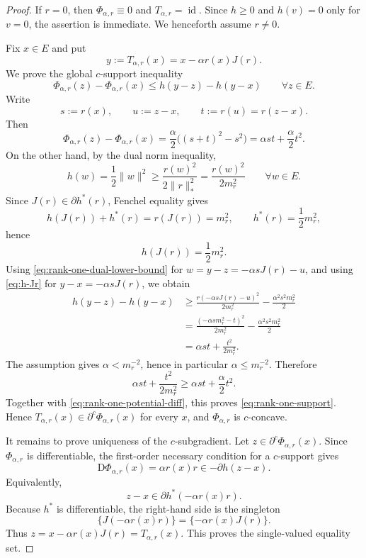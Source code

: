 \documentclass[a4paper,11pt]{article}
\numberwithin{equation}{section}
\newcommand{\id}{\operatorname{id}}
\newcommand{\D}{\mathrm D}
\begin{document}
	\begin{proof}
		If \(r=0\), then \(\Phi_{\alpha,r}\equiv0\) and \(T_{\alpha,r}=\id\). Since
		\(h\ge0\) and \(h(v)=0\) only for \(v=0\), the assertion is immediate. We henceforth
		assume \(r\ne0\).
		
		Fix \(x\in E\) and put
		\[
		y:=T_{\alpha,r}(x)=x-\alpha r(x)J(r).
		\]
		We prove the global \(c\)-support inequality
		\begin{equation}\label{eq:rank-one-support}
			\Phi_{\alpha,r}(z)-\Phi_{\alpha,r}(x)
			\le h(y-z)-h(y-x)
			\qquad\forall z\in E.
		\end{equation}
		Write
		\[
		s:=r(x),
		\qquad
		u:=z-x,
		\qquad
		t:=r(u)=r(z-x).
		\]
		Then
		\begin{equation}\label{eq:rank-one-potential-diff}
			\Phi_{\alpha,r}(z)-\Phi_{\alpha,r}(x)
			=\frac{\alpha}{2}\bigl((s+t)^2-s^2\bigr)
			=\alpha st+\frac{\alpha}{2}t^2.
		\end{equation}
		On the other hand, by the dual norm inequality,
		\begin{equation}\label{eq:rank-one-dual-lower-bound}
			h(w)=\frac12\|w\|^2
			\ge \frac{r(w)^2}{2\|r\|_*^2}
			=\frac{r(w)^2}{2m_r^2}
			\qquad\forall w\in E.
		\end{equation}
		Since \(J(r)\in\partial h^*(r)\), Fenchel equality gives
		\[
		h(J(r))+h^*(r)=r(J(r))=m_r^2,
		\qquad h^*(r)=\frac12m_r^2,
		\]
		hence
		\begin{equation}\label{eq:h-Jr}
			h(J(r))=\frac12m_r^2.
		\end{equation}
		Using \eqref{eq:rank-one-dual-lower-bound} for \(w=y-z=-\alpha sJ(r)-u\), and
		using \eqref{eq:h-Jr} for \(y-x=-\alpha sJ(r)\), we obtain
		\[
		\begin{aligned}
			h(y-z)-h(y-x)
			&\ge
			\frac{r(-\alpha sJ(r)-u)^2}{2m_r^2}
			-\frac{\alpha^2s^2m_r^2}{2} \\
			&=
			\frac{(-\alpha sm_r^2-t)^2}{2m_r^2}
			-\frac{\alpha^2s^2m_r^2}{2} \\
			&=
			\alpha st+\frac{t^2}{2m_r^2}.
		\end{aligned}
		\]
		The assumption gives \(\alpha<m_r^{-2}\), hence in particular \(\alpha\le m_r^{-2}\).
		Therefore
		\[
		\alpha st+\frac{t^2}{2m_r^2}
		\ge
		\alpha st+\frac{\alpha}{2}t^2.
		\]
		Together with \eqref{eq:rank-one-potential-diff}, this proves
		\eqref{eq:rank-one-support}. Hence
		\(T_{\alpha,r}(x)\in\partial^c\Phi_{\alpha,r}(x)\) for every \(x\), and
		\(\Phi_{\alpha,r}\) is \(c\)-concave.
		
		It remains to prove uniqueness of the \(c\)-subgradient. Let
		\(z\in\partial^c\Phi_{\alpha,r}(x)\). Since \(\Phi_{\alpha,r}\) is differentiable,
		the first-order necessary condition for a \(c\)-support gives
		\[
		\D\Phi_{\alpha,r}(x)=\alpha r(x)r\in -\partial h(z-x).
		\]
		Equivalently,
		\[
		z-x\in \partial h^*(-\alpha r(x)r).
		\]
		Because \(h^*\) is differentiable, the right-hand side is the singleton
		\[
		\{J(-\alpha r(x)r)\}
		=\{-\alpha r(x)J(r)\}.
		\]
		Thus \(z=x-\alpha r(x)J(r)=T_{\alpha,r}(x)\). This proves the single-valued equality
		set.
	\end{proof}
	
\end{document}
